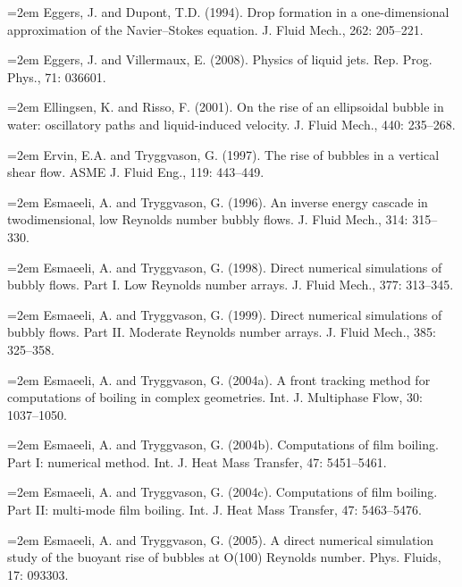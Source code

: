\documentclass[11pt,a4paper,openany,fontset=none]{ctexbook}
\begin{document}
\par\hangindent=2em Eggers, J. and Dupont, T.D. (1994). Drop formation in a one-dimensional approximation of the Navier--Stokes equation. J. Fluid Mech., 262: 205--221.

\par\hangindent=2em Eggers, J. and Villermaux, E. (2008). Physics of liquid jets. Rep. Prog. Phys., 71: 036601.

\par\hangindent=2em Ellingsen, K. and Risso, F. (2001). On the rise of an ellipsoidal bubble in water: oscillatory paths and liquid-induced velocity. J. Fluid Mech., 440: 235--268.

\par\hangindent=2em Ervin, E.A. and Tryggvason, G. (1997). The rise of bubbles in a vertical shear flow. ASME J. Fluid Eng., 119: 443--449.

\par\hangindent=2em Esmaeeli, A. and Tryggvason, G. (1996). An inverse energy cascade in twodimensional, low Reynolds number bubbly flows. J. Fluid Mech., 314: 315--330.

\par\hangindent=2em Esmaeeli, A. and Tryggvason, G. (1998). Direct numerical simulations of bubbly flows. Part I. Low Reynolds number arrays. J. Fluid Mech., 377: 313--345.

\par\hangindent=2em Esmaeeli, A. and Tryggvason, G. (1999). Direct numerical simulations of bubbly flows. Part II. Moderate Reynolds number arrays. J. Fluid Mech., 385: 325--358.

\par\hangindent=2em Esmaeeli, A. and Tryggvason, G. (2004a). A front tracking method for computations of boiling in complex geometries. Int. J. Multiphase Flow, 30: 1037--1050.


\par\hangindent=2em Esmaeeli, A. and Tryggvason, G. (2004b). Computations of film boiling. Part I: numerical method. Int. J. Heat Mass Transfer, 47: 5451--5461.

\par\hangindent=2em Esmaeeli, A. and Tryggvason, G. (2004c). Computations of film boiling. Part II: multi-mode film boiling. Int. J. Heat Mass Transfer, 47: 5463--5476.

\par\hangindent=2em Esmaeeli, A. and Tryggvason, G. (2005). A direct numerical simulation study of the buoyant rise of bubbles at O(100) Reynolds number. Phys. Fluids, 17: 093303.
\end{document}
